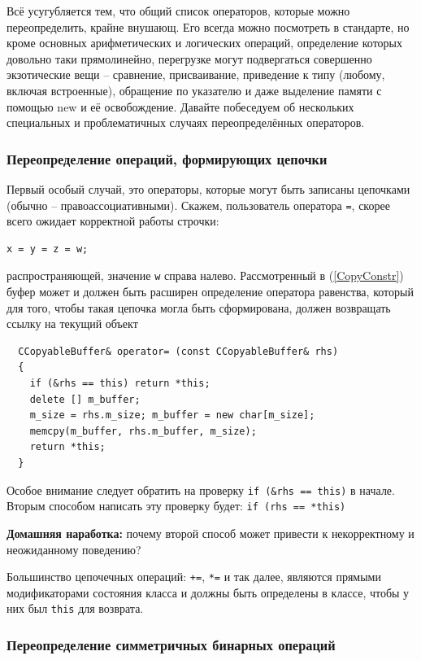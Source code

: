 \documentclass[a4paper,12pt,oneside]{article}
\begin{document}
Всё усугубляется тем, что общий список операторов, которые можно переопределить, крайне внушающ. Его всегда можно посмотреть в стандарте, но кроме основных арифметических и логических операций, определение которых довольно таки прямолинейно, перегрузке могут подвергаться совершенно экзотические вещи – сравнение, присваивание, приведение к типу (любому, включая встроенные), обращение по указателю и даже выделение памяти с помощью new и её освобождение. Давайте побеседуем об нескольких специальных и проблематичных случаях переопределённых операторов.

\subsubsection{Переопределение операций, формирующих цепочки}\label{ChainOps}

Первый особый случай, это операторы, которые могут быть записаны цепочками (обычно -- правоассоциативными). Скажем, пользователь оператора \lstinline!=!, скорее всего ожидает корректной работы строчки:

\begin{lstlisting}
x = y = z = w;
\end{lstlisting}

распространяющей, значение \lstinline!w! справа налево. Рассмотренный в (\ref{CopyConstr}) буфер может и должен быть расширен определение оператора равенства, который для того, чтобы такая цепочка могла быть сформирована, должен возвращать ссылку на текущий объект

\begin{lstlisting}
  CCopyableBuffer& operator= (const CCopyableBuffer& rhs)
  {
    if (&rhs == this) return *this;
    delete [] m_buffer;
    m_size = rhs.m_size; m_buffer = new char[m_size];
    memcpy(m_buffer, rhs.m_buffer, m_size);
    return *this;
  }
\end{lstlisting}

Особое внимание следует обратить на проверку \lstinline!if (&rhs == this)! в начале. Вторым способом написать эту проверку будет: \lstinline!if (rhs == *this)!

\textbf{Домашняя наработка:} почему второй способ может привести к некорректному и неожиданному поведению?

Большинство цепочечных операций: \lstinline!+=!, \lstinline!*=! и так далее, являются прямыми модификаторами состояния класса и должны быть определены в классе, чтобы у них был \lstinline!this! для возврата.

\subsubsection{Переопределение симметричных бинарных операций}\label{SymmBinary}
\end{document}
